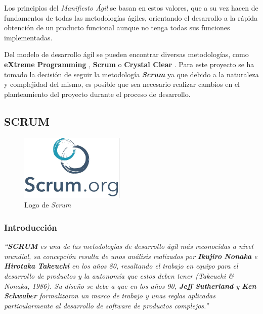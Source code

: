 Los principios del \textit{Manifiesto Ágil} se basan en estos valores, que a su vez hacen de fundamentos de 
todas las metodologías ágiles, orientando el desarrollo a la rápida obtención de un producto funcional 
aunque no tenga todas sus funciones implementadas. \medskip

Del modelo de desarrollo ágil se pueden encontrar diversas metodologías, como \textbf{eXtreme Programming} \autocite*{Stephens2003},
\textbf{Scrum} \autocite*{Schwaber2011} o \textbf{Crystal Clear} \autocite*{Cockburn2004}. 
Para este proyecto se ha tomado la decisión de seguir la metodología \textit{\textbf{Scrum}} ya que debido a la naturaleza y complejidad del mismo, 
es posible que sea necesario realizar cambios en el planteamiento del proyecto durante el proceso de desarrollo. \medskip

\subsection{SCRUM}
\begin{figure}[H]
    \centering
    \includegraphics[width=5cm]{Images/Logo_Scrum.jpeg}
    \caption{Logo de \textit{Scrum}}
\end{figure}

\subsubsection{Introducción}
\textit{“\textbf{SCRUM} es una de las metodologías de desarrollo ágil más reconocidas a nivel mundial, su concepción resulta de unos 
análisis realizados por \textbf{Ikujiro} \textbf{Nonaka} e \textbf{Hirotaka} \textbf{Takeuchi} en los años 80, resaltando el trabajo en equipo para el 
desarrollo de productos y la autonomía que estos deben tener (Takeuchi \& Nonaka, 1986). Su diseño se debe a que 
en los años 90, \textbf{Jeff} \textbf{Sutherland} y \textbf{Ken} \textbf{Schwaber} formalizaron un marco de trabajo y unas reglas aplicadas 
particularmente al desarrollo de software de productos complejos.”} \autocite*{Rodriguez} \medskip 

